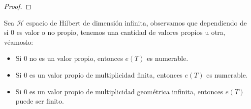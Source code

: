 \begin{teo}
\begin{proof}





\end{proof}
\end{teo}

\begin{observacion}   
    Sea $\mathcal{H}$ espacio de Hilbert de dimensión infinita, observamos que dependiendo de si $0$ es valor o no propio, tenemos una cantidad de valores propios u otra, véamoslo:
    \begin{itemize}
        \item Si $0$ no es un valor propio, entonces $e(T)$ es numerable.
        \item Si $0$ es un valor propio de multiplicidad finita, entonces $e(T)$ es numerable.
        \item Si $0$ es un valor propio de multiplicidad geométrica infinita, entonces $e(T)$ puede ser finito.
    \end{itemize}
\end{observacion}

